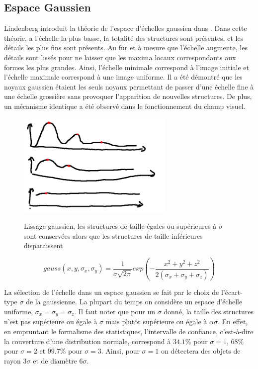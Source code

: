 \subsection{Espace Gaussien}
\label{sec:EA:rehaussement:echelle:gaussien}

Lindenberg introduit la théorie de l'espace d'échelles gaussien dans \cite{lindeberg2013_scale}. Dans cette théorie, a l'échelle la plus basse, la totalité des structures sont présentes, et les détails les plus fins sont présents. Au fur et à mesure que l'échelle augmente, les détails sont lissés pour ne laisser que les maxima locaux correspondants aux formes les plus grandes. Ainsi, l'échelle minimale correspond à l'image initiale et l'échelle maximale correspond à une image uniforme. Il a été démontré que les noyaux gaussien étaient les seuls noyaux permettant de passer d'une échelle fine à une échelle grossière sans provoquer l'apparition de nouvelles structures. De plus, un mécanisme identique a été observé dans le fonctionnement du champ visuel.

\begin{figure}
  \centering
  \includegraphics[height=5cm]{Images/gaussian_smoothing.png}
  \label{fig:gaussian_smoothing}
  \caption{Lissage gaussien, les structures de taille égales ou supérieures à $\sigma$ sont conservées alors que les structures de taille inférieures disparaissent}
\end{figure}

\begin{equation}
  gauss(x,y,\sigma_{x},\sigma_{y}) = \frac{1}{ \sigma\sqrt{2\pi} }exp(-\frac{x^2 + y^2 + z^2}{2(\sigma_{x}+ \sigma_{y}+ \sigma_{z}) })
\end{equation}

La sélection de l'échelle dans un espace gaussien se fait par le choix de l'écart-type $\sigma$ de la gaussienne. La plupart du temps on considère un espace d'échelle uniforme, $\sigma_x = \sigma_y = \sigma_z$. Il faut noter que pour un $\sigma$ donné, la taille des structures n'est pas supérieure ou égale à $\sigma$ mais plutôt supérieure ou égale à $\alpha\sigma$. En effet, en empruntant le formalisme des statistiques, l'intervalle de confiance, c'est-à-dire la couverture d'une distribution normale, correspond à $34.1\%$ pour $\sigma=1$, $68\%$ pour $\sigma=2$ et $99.7\%$ pour $\sigma=3$. Ainsi, pour $\sigma=1$ on détectera des objets de rayon $3\sigma$ et de diamètre $6\sigma$.  

